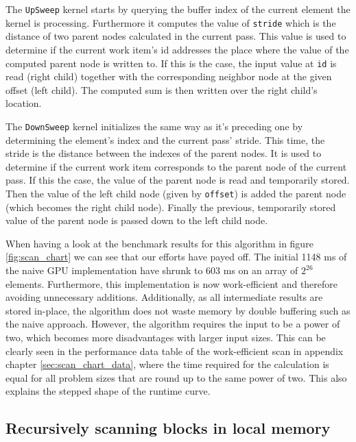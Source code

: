 

The \lstinline!UpSweep! kernel starts by querying the buffer index of the current element the kernel is processing. Furthermore it computes the value of \lstinline!stride! which is the distance of two parent nodes calculated in the current pass. This value is used to determine if the current work item's id addresses the place where the value of the computed parent node is written to. If this is the case, the input value at \lstinline!id! is read (right child) together with the corresponding neighbor node at the given offset (left child). The computed sum is then written over the right child's location.

The \lstinline!DownSweep! kernel initializes the same way as it's preceding one by determining the element's index and the current pass' stride. This time, the stride is the distance between the indexes of the parent nodes. It is used to determine if the current work item corresponds to the parent node of the current pass. If this the case, the value of the parent node is read and temporarily stored. Then the value of the left child node (given by \lstinline!offset!) is added the parent node (which becomes the right child node). Finally the previous, temporarily stored value of the parent node is passed down to the left child node.

When having a look at the benchmark results for this algorithm in figure \ref{fig:scan_chart} we can see that our efforts have payed off. The initial 1148 ms of the naive GPU implementation have shrunk to 603 ms on an array of $2^{26}$ elements. Furthermore, this implementation is now work-efficient and therefore avoiding unnecessary additions. Additionally, as all intermediate results are stored in-place, the algorithm does not waste memory by double buffering such as the naive approach. However, the algorithm requires the input to be a power of two, which becomes more disadvantages with larger input sizes. This can be clearly seen in the performance data table of the work-efficient scan in appendix chapter \ref{sec:scan_chart_data}, where the time required for the calculation is equal for all problem sizes that are round up to the same power of two. This also explains the stepped shape of the runtime curve.

\subsection{Recursively scanning blocks in local memory}

